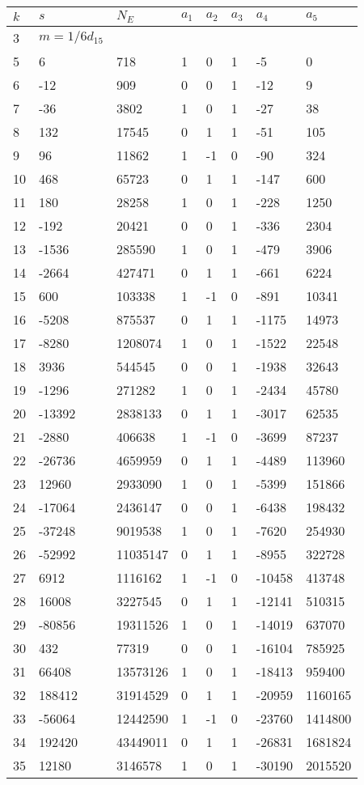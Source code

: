 \documentclass{amsart}
\begin{document}
\begin{longtable}{|l|l|l|lllll|}
\hline
$k$ & $s$ & $N_E$ & $a_1$ & $a_2$ & $a_3$ & $a_4$ & $a_5$\\
\hline
3&$m=1/6d_{15}$&&\multicolumn{5}{c|}{}\\
5&6&718&1&0&1&-5&0\\
6&-12&909&0&0&1&-12&9\\
7&-36&3802&1&0&1&-27&38\\
8&132&17545&0&1&1&-51&105\\
9&96&11862&1&-1&0&-90&324\\
10&468&65723&0&1&1&-147&600\\
11&180&28258&1&0&1&-228&1250\\
12&-192&20421&0&0&1&-336&2304\\
13&-1536&285590&1&0&1&-479&3906\\
14&-2664&427471&0&1&1&-661&6224\\
15&600&103338&1&-1&0&-891&10341\\
16&-5208&875537&0&1&1&-1175&14973\\
17&-8280&1208074&1&0&1&-1522&22548\\
18&3936&544545&0&0&1&-1938&32643\\
19&-1296&271282&1&0&1&-2434&45780\\
20&-13392&2838133&0&1&1&-3017&62535\\
21&-2880&406638&1&-1&0&-3699&87237\\
22&-26736&4659959&0&1&1&-4489&113960\\
23&12960&2933090&1&0&1&-5399&151866\\
24&-17064&2436147&0&0&1&-6438&198432\\
25&-37248&9019538&1&0&1&-7620&254930\\
26&-52992&11035147&0&1&1&-8955&322728\\
27&6912&1116162&1&-1&0&-10458&413748\\
28&16008&3227545&0&1&1&-12141&510315\\
29&-80856&19311526&1&0&1&-14019&637070\\
30&432&77319&0&0&1&-16104&785925\\
31&66408&13573126&1&0&1&-18413&959400\\
32&188412&31914529&0&1&1&-20959&1160165\\
33&-56064&12442590&1&-1&0&-23760&1414800\\
34&192420&43449011&0&1&1&-26831&1681824\\
35&12180&3146578&1&0&1&-30190&2015520\\

\end{longtable}
\end{document}
